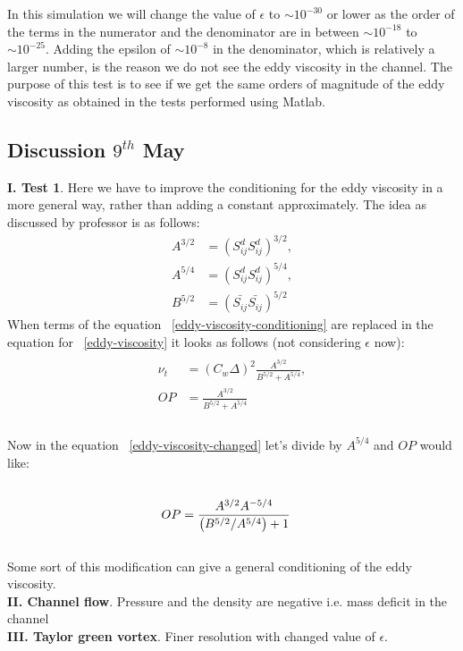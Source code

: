 \documentclass[a4paper]{article}
\def\sij{\bar{S_{ij}}}
\begin{document}
In this simulation we will change the value of $\epsilon$ to $\sim 10^{-30}$ or lower as the order of the terms in the numerator and the denominator are in between $\sim 10^{-18}$ to $\sim 10^{-25}$. Adding the epsilon of $\sim 10^{-8}$ in the denominator, which is relatively a larger number, is the reason we do not see the eddy viscosity in the channel. The purpose of this test is to see if we get the same orders of magnitude of the eddy viscosity as obtained in the tests performed using Matlab.
\subsection{Discussion $9^{th}$ May}

{\bf I. Test 1}. Here we have to improve the conditioning for the eddy viscosity in a more general way, rather than adding a constant  approximately. The idea as discussed by professor is as follows:
\begin{equation}
\label{eddy-viscosity-conditioning}
\begin{split}
A^{3/2} &= \left({S_{ij}^{d}}{S_{ij}^{d}}\right)^{3/2},\\
A^{5/4} &= \left({S_{ij}^{d}}{S_{ij}^{d}}\right)^{5/4},\\
B^{5/2} &= \left(\sij \sij\right)^{5/2}
\end{split}
\end{equation}
When terms of the equation ~\ref{eddy-viscosity-conditioning} are replaced in the equation for ~\ref{eddy-viscosity} it looks as follows (not considering $\epsilon$ now):
\begin{equation}
\label{eddy-viscosity-changed}
\begin{split}\\
{\nu_t} &= \left({C_w}{\Delta}\right)^{2}
\frac{A^{3/2}}{B^{5/2} + {A^{5/4}}},\\
{OP} &= \frac{A^{3/2}}{B^{5/2} + {A^{5/4}}}\\
\end{split}
\end{equation}\\
Now in the equation ~\ref{eddy-viscosity-changed} let's divide by ${A^{5/4}}$ and ${OP}$ would like:
\begin{equation}
\label{some_modification}
\begin{split}\\
{OP} &= \frac{A^{3/2}A^{\--5/4}}{\left(B^{5/2}\// {A^{5/4}}\right) + 1}\\
\end{split}
\end{equation}\\
Some sort of this modification can give a general conditioning of the eddy viscosity.\\
{\bf II. Channel flow}.  Pressure and the density are negative i.e. mass deficit in the channel\\
{\bf III. Taylor green vortex}. Finer resolution with changed value of $\epsilon$. 
\end{document}
